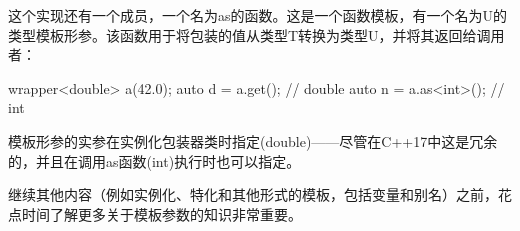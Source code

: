 这个实现还有一个成员，一个名为as的函数。这是一个函数模板，有一个名为U的类型模板形参。该函数用于将包装的值从类型T转换为类型U，并将其返回给调用者：


\begin{cpp}
wrapper<double> a(42.0);
auto d = a.get(); // double
auto n = a.as<int>(); // int
\end{cpp}

模板形参的实参在实例化包装器类时指定(double)——尽管在C++17中这是冗余的，并且在调用as函数(int)执行时也可以指定。

继续其他内容（例如实例化、特化和其他形式的模板，包括变量和别名）之前，花点时间了解更多关于模板参数的知识非常重要。







